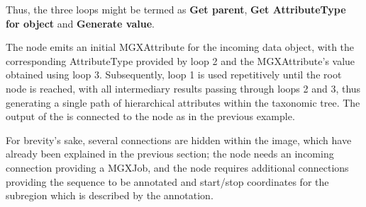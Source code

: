 Thus, the three loops might be termed as \textbf{Get parent}, \textbf{Get AttributeType for object} and
\textbf{Generate value}. 

The  node emits an initial MGXAttribute for the incoming data object,
with the corresponding AttributeType provided by loop 2 and the MGXAttribute's value obtained using loop 3.
Subsequently, loop 1 is used repetitively until the root node is reached, with all intermediary results
passing through loops 2 and 3, thus generating a single path of hierarchical attributes within the taxonomic
tree. The output of the  is connected to the 
node as in the previous example.

For brevity's sake, several connections are hidden within the image, which have already been explained in the
previous section; the  node needs an incoming connection providing a MGXJob,
and the  node requires additional connections providing the sequence to be annotated
and start/stop coordinates for the subregion which is described by the annotation.



